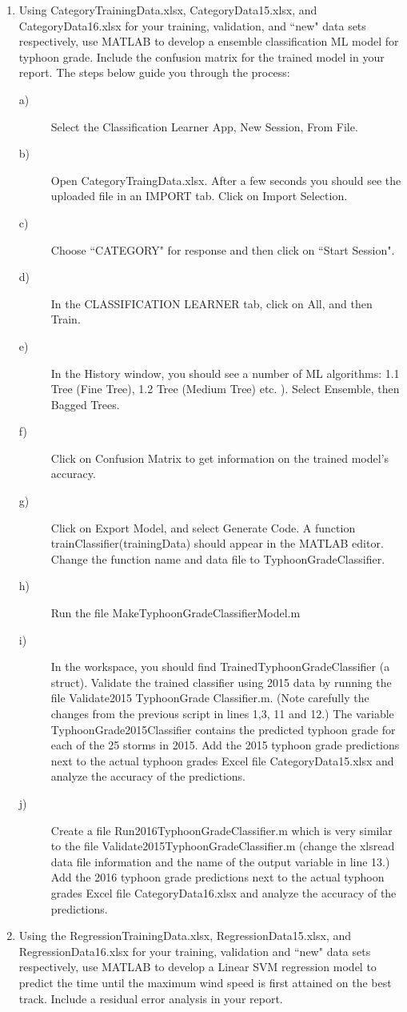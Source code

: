 \documentclass{SBCbookchapter}
\begin{document}
	\begin{enumerate}
		\item Using CategoryTrainingData.xlsx,  CategoryData15.xlsx, and CategoryData16.xlsx for your training, validation, and ``new" data sets respectively, use MATLAB to develop a ensemble classification ML model for typhoon grade. Include the confusion matrix for the trained model in your report. The steps below guide you through the process:
		
			\begin{description}
			\item[a)] Select the Classification Learner App, New Session, From File.
			\item[b)] Open CategoryTraingData.xlsx. After a few seconds you should see the uploaded file in an IMPORT tab.  Click on Import Selection.
			\item[c)] Choose ``CATEGORY" for response and then click on ``Start Session".
			\item[d)] In the CLASSIFICATION LEARNER tab, click on All, and then Train.
			\item[e)] In the History window, you should see a number of ML algorithms: 1.1 Tree (Fine Tree), 1.2 Tree (Medium Tree) etc. ). Select Ensemble, then Bagged Trees.
			\item[f)]  Click on Confusion Matrix to get information on the trained model's accuracy.
			\item[g)] Click on Export Model, and select Generate Code.  A function trainClassifier(trainingData) should appear in the MATLAB editor.  Change the function name and data file to TyphoonGradeClassifier.
			\item[h)] Run the file MakeTyphoonGradeClassifierModel.m
			\item[i)] In the workspace, you should find TrainedTyphoonGradeClassifier (a struct). Validate the trained classifier using 2015 data   by running the file Validate2015 TyphoonGrade Classifier.m. (Note carefully the changes from the previous script in lines 1,3, 11 and 12.) The variable TyphoonGrade2015Classifier contains the predicted typhoon grade for each of the 25 storms in 2015. Add the 2015 typhoon grade predictions next to the actual typhoon grades  Excel file CategoryData15.xlsx and analyze the accuracy of the predictions.
			\item[j)] Create a file Run2016TyphoonGradeClassifier.m which is very similar to the file  Validate2015TyphoonGradeClassifier.m (change the xlsread data file information and the name of the output variable in line 13.) Add the 2016 typhoon grade predictions next to the actual typhoon grades  Excel file CategoryData16.xlsx and analyze the accuracy of the predictions.
			
		\end{description}
		
		\item Using the RegressionTrainingData.xlsx, RegressionData15.xlsx, and RegressionData16.xlsx for your training, validation and ``new" data sets respectively, use MATLAB to develop  a Linear SVM regression model to predict the time until the maximum wind speed is first attained on the best track. Include a residual error analysis in your report.
	\end{enumerate}
	
\end{document}
